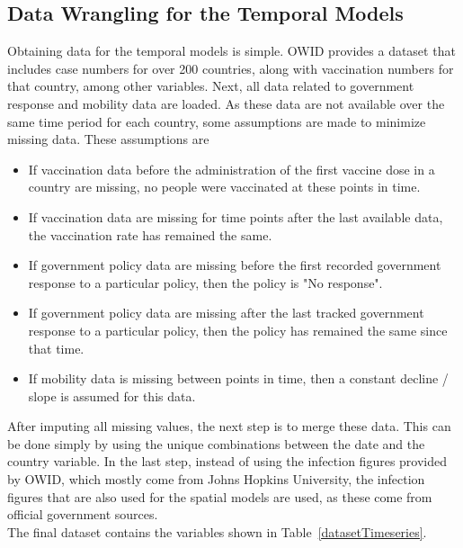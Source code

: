 \subsection{Data Wrangling for the Temporal Models}
Obtaining data for the temporal models is simple. OWID provides a dataset that includes case numbers for over 200 countries, along with vaccination numbers for that country, among other variables. Next, all data related to government response and mobility data are loaded. As these data are not available over the same time period for each country, some assumptions are made to minimize missing data. These assumptions are
\begin{itemize}
    \item If vaccination data before the administration of the first vaccine dose in a country are missing, no people were vaccinated at these points in time.
    \item If vaccination data are missing for time points after the last available data, the vaccination rate has remained the same.
    \item If government policy data are missing before the first recorded government response to a particular policy, then the policy is "No response".
    \item If government policy data are missing after the last tracked government response to a particular policy, then the policy has remained the same since that time.
    \item If mobility data is missing between points in time, then a constant decline / slope is assumed for this data.
\end{itemize}
After imputing all missing values, the next step is to merge these data. This can be done simply by using the unique combinations between the date and the country variable. In the last step, instead of using the infection figures provided by OWID, which mostly come from Johns Hopkins University, the infection figures that are also used for the spatial models are used, as these come from official government sources. \\
The final dataset contains the variables shown in Table~\ref{datasetTimeseries}.

